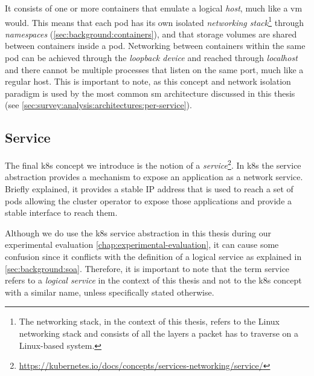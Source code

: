 It consists of one or more containers that emulate a logical \textit{host}, much like a \gls{vm} would. This means that each pod has its own isolated \textit{networking stack}\footnote{The networking stack, in the context of this thesis, refers to the Linux networking stack and consists of all the layers a packet has to traverse on a Linux-based system.} through \textit{namespaces} (\cref{sec:background:containers}), and that storage volumes are shared between containers inside a pod. Networking between containers within the same pod can be achieved through the \textit{loopback device} and reached through \textit{localhost} and there cannot be multiple processes that listen on the same port, much like a regular host. This is important to note, as this concept and network isolation paradigm is used by the most common \gls{sm} architecture discussed in this thesis (see \cref{sec:survey:analysis:architectures:per-service}).


\subsection{Service}
\label{sec:background:kubernetes:service}

The final \gls{k8s} concept we introduce is the notion of a \textit{service}\footnote{\url{https://kubernetes.io/docs/concepts/services-networking/service/}}. In \gls{k8s} the service abstraction provides a mechanism to expose an application as a network service. Briefly explained, it provides a stable IP address that is used to reach a set of pods allowing the cluster operator to expose those applications and provide a stable interface to reach them. 

Although we do use the \gls{k8s} service abstraction in this thesis during our experimental evaluation \cref{chap:experimental-evaluation}, it can cause some confusion since it conflicts with the definition of a logical service as explained in \cref{sec:background:soa}. Therefore, it is important to note that the term service refers to a \textit{logical service} in the context of this thesis and not to the \gls{k8s} concept with a similar name, unless specifically stated otherwise.